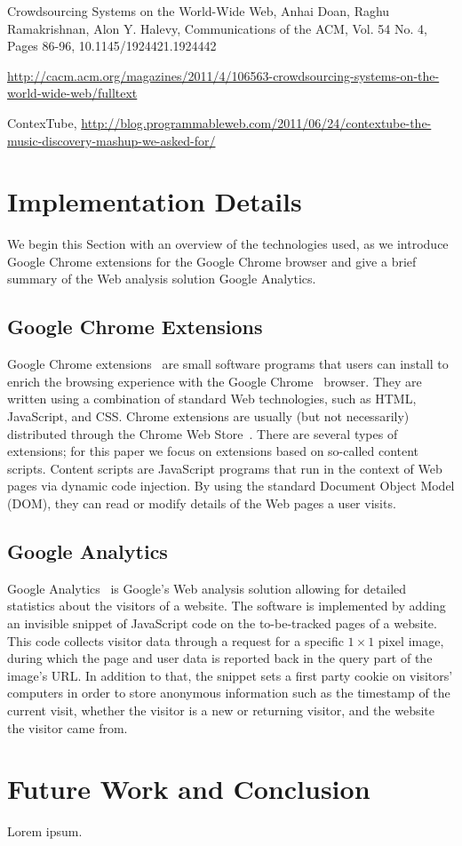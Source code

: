 \documentclass[runningheads,a4paper]{llncs}
\begin{document}
Crowdsourcing Systems on the World-Wide Web, Anhai Doan, Raghu Ramakrishnan, Alon Y. Halevy, Communications of the ACM,
Vol. 54 No. 4, Pages 86-96, 10.1145/1924421.1924442 

\url{http://cacm.acm.org/magazines/2011/4/106563-crowdsourcing-systems-on-the-world-wide-web/fulltext}


ContexTube, \url{http://blog.programmableweb.com/2011/06/24/contextube-the-music-discovery-mashup-we-asked-for/}

\section{Implementation Details} \label{sec:implementation}
We begin this Section with an overview of the technologies used, as we introduce Google Chrome extensions for the Google Chrome browser and give a brief summary of the Web analysis solution Google Analytics.

\subsection{Google Chrome Extensions}
Google Chrome extensions~\cite{chromeextensions} are small software programs that users can install to enrich the browsing experience with the Google Chrome~\cite{chrome} browser. They are written using a combination of standard Web technologies, such as HTML, JavaScript, and CSS. Chrome extensions are usually (but not necessarily) distributed through the Chrome Web Store~\cite{chromewebstore}. There are several types of extensions; for this paper we focus on extensions based on so-called content scripts. Content scripts are JavaScript programs that run in the context of Web pages via dynamic code injection. By using the standard Document Object Model (DOM), they can read or modify details of the Web pages a user visits.

\subsection{Google Analytics}
Google Analytics~\cite{googleanalytics} is Google's Web analysis solution allowing for detailed statistics about the visitors of a website. The software is implemented by adding an invisible snippet of JavaScript code on the to-be-tracked pages of a website. This code collects visitor data through a request for a specific $1 \times 1$ pixel image, during which the page and user data is reported back in the query part of the image's URL. In addition to that, the snippet sets a first party cookie on visitors' computers in order to store anonymous information such as the timestamp of the current visit, whether the visitor is a new or returning visitor, and the website the visitor came from.

\section{Future Work and Conclusion} \label{sec:future-work-conclusion}
Lorem ipsum.

\renewcommand{\ttdefault}{cmvtt}
\renewcommand\UrlFont\tt



\end{document}
